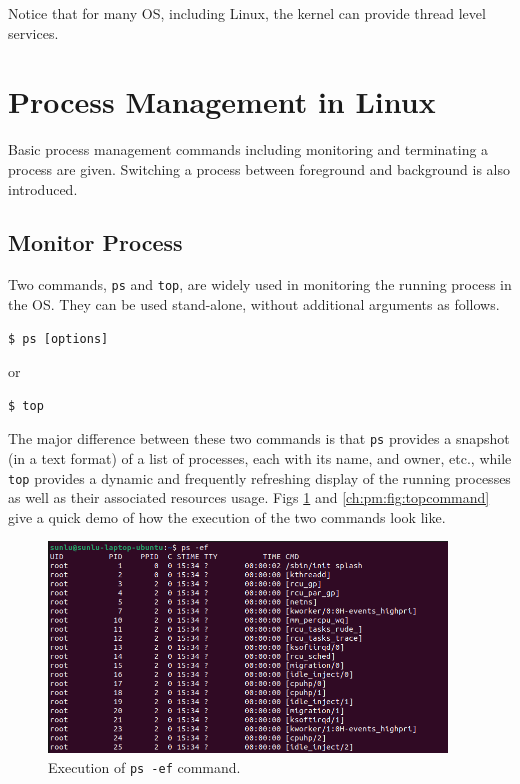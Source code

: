Notice that for many OS, including Linux, the kernel can provide thread level services.

\section{Process Management in Linux}

Basic process management commands including monitoring and terminating a process are given. Switching a process between foreground and background is also introduced.

\subsection{Monitor Process}

Two commands, \verb|ps| and \verb|top|, are widely used in monitoring the running process in the OS. They can be used stand-alone, without additional arguments as follows.
\begin{lstlisting}
$ ps [options]
\end{lstlisting}
or
\begin{lstlisting}
$ top
\end{lstlisting}

The major difference between these two commands is that \verb|ps| provides a snapshot (in a text format) of a list of processes, each with its name,  and owner, etc., while \verb|top| provides a dynamic and frequently refreshing display of the running processes as well as their associated resources usage. Figs \ref{ch:pm:fig:pscommand} and \ref{ch:pm:fig:topcommand} give a quick demo of how the execution of the two commands look like.

\begin{figure}[!htb]
	\centering
	\includegraphics[width=300pt]{chapters/part-1/figures/pscommand.png}
	\caption{Execution of \texttt{ps -ef} command.} \label{ch:pm:fig:pscommand}
\end{figure}

